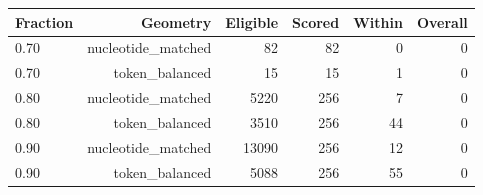 \begin{tabular}{lrrrrr}
\toprule
Fraction & Geometry & Eligible & Scored & Within & Overall \\
\midrule
0.70 & nucleotide\_matched & 82 & 82 & 0 & 0 \\
0.70 & token\_balanced & 15 & 15 & 1 & 0 \\
0.80 & nucleotide\_matched & 5220 & 256 & 7 & 0 \\
0.80 & token\_balanced & 3510 & 256 & 44 & 0 \\
0.90 & nucleotide\_matched & 13090 & 256 & 12 & 0 \\
0.90 & token\_balanced & 5088 & 256 & 55 & 0 \\
\bottomrule
\end{tabular}